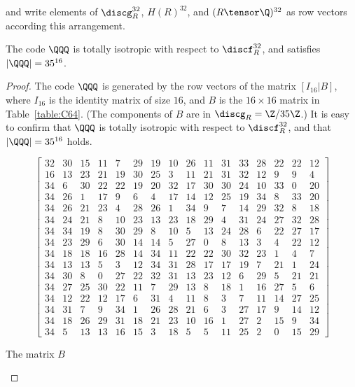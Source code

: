 \documentclass{amsart}
\begin{document}
%
and write elements of $\discg_R^{32}$, $H(R)^{32}$,  and  $(R\tensor\Q)^{32}$
as row vectors according this arrangement.
\par
%
\begin{proposition}
The code $\QQQ$ is totally isotropic with respect to $\discf_R^{32}$,
and satisfies $|\QQQ|=35^{16}$.
\end{proposition}
%
\begin{proof}
The  code $\QQQ$ 
is generated by
the row vectors of the matrix
$\left[ I_{16}| B\right]$, where $I_{16}$ is the identity matrix of size $16$,
and $B$ is the $16\times 16$ matrix 
in Table~\ref{table:C64}.
(The components of $B$ are in $\discg_R=\Z/35\Z$.)
It is easy to confirm that $\QQQ$ is totally isotropic 
with respect to $\discf_R^{32}$, and that $|\QQQ|=35^{16}$ holds.
%
\begin{table}
$$
\left[\begin{array}{cccccccccccccccc} 
32 & 30 & 15 & 11 & 7 & 29 & 19 & 10 & 26 & 11 & 31 & 33 & 28 & 22 & 22 & 12 \\ 
16 & 13 & 23 & 21 & 19 & 30 & 25 & 3 & 11 & 21 & 31 & 32 & 12 & 9 & 9 & 4 \\ 
34 & 6 & 30 & 22 & 22 & 19 & 20 & 32 & 17 & 30 & 30 & 24 & 10 & 33 & 0 & 20 \\ 
34 & 26 & 1 & 17 & 9 & 6 & 4 & 17 & 14 & 12 & 25 & 19 & 34 & 8 & 33 & 20 \\ 
34 & 26 & 21 & 23 & 4 & 28 & 26 & 1 & 34 & 9 & 7 & 14 & 29 & 32 & 8 & 18 \\ 
34 & 24 & 21 & 8 & 10 & 23 & 13 & 23 & 18 & 29 & 4 & 31 & 24 & 27 & 32 & 28 \\ 
34 & 34 & 19 & 8 & 30 & 29 & 8 & 10 & 5 & 13 & 24 & 28 & 6 & 22 & 27 & 17 \\ 
34 & 23 & 29 & 6 & 30 & 14 & 14 & 5 & 27 & 0 & 8 & 13 & 3 & 4 & 22 & 12 \\ 
34 & 18 & 18 & 16 & 28 & 14 & 34 & 11 & 22 & 22 & 30 & 32 & 23 & 1 & 4 & 7 \\ 
34 & 13 & 13 & 5 & 3 & 12 & 34 & 31 & 28 & 17 & 17 & 19 & 7 & 21 & 1 & 24 \\ 
34 & 30 & 8 & 0 & 27 & 22 & 32 & 31 & 13 & 23 & 12 & 6 & 29 & 5 & 21 & 21 \\ 
34 & 27 & 25 & 30 & 22 & 11 & 7 & 29 & 13 & 8 & 18 & 1 & 16 & 27 & 5 & 6 \\ 
34 & 12 & 22 & 12 & 17 & 6 & 31 & 4 & 11 & 8 & 3 & 7 & 11 & 14 & 27 & 25 \\ 
34 & 31 & 7 & 9 & 34 & 1 & 26 & 28 & 21 & 6 & 3 & 27 & 17 & 9 & 14 & 12 \\ 
34 & 18 & 26 & 29 & 31 & 18 & 21 & 23 & 10 & 16 & 1 & 27 & 2 & 15 & 9 & 34 \\ 
34 & 5 & 13 & 13 & 16 & 15 & 3 & 18 & 5 & 5 & 11 & 25 & 2 & 0 & 15 & 29 
\end{array}\right] 
$$
\caption{The matrix $B$}\label{table:C64}
\end{table}
%
\end{proof}
\end{document}
